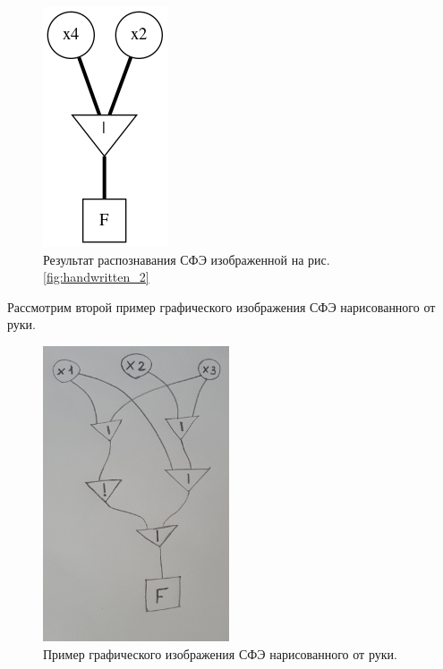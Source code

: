 \documentclass[makeidx, a4paper, 14pt]{extarticle}
\begin{document}
\begin{figure}[H]
    \centering
    \includegraphics{handwritten_2_result.png}
    \caption{Результат распознавания СФЭ изображенной на рис. \ref{fig:handwritten_2}}
\end{figure}

\newpage

Рассмотрим второй пример графического изображения СФЭ нарисованного от руки.

\begin{figure}[H]
    \centering
    \includegraphics[width=55mm]{handwritten_1.png}
    \caption{Пример графического изображения СФЭ нарисованного от руки.}
    \label{fig:handwritten_1}
\end{figure}
\end{document}
